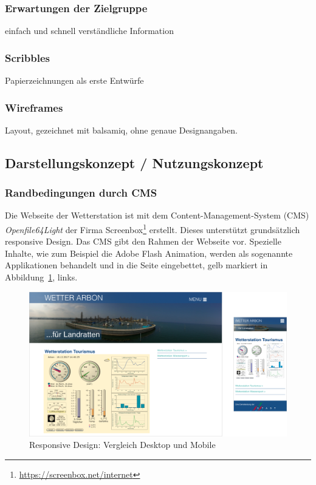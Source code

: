 \subsubsection*{Erwartungen der Zielgruppe}
einfach und schnell verständliche Information
\subsubsection*{Scribbles}
Papierzeichnungen als erste Entwürfe
\subsubsection*{Wireframes}
Layout, gezeichnet mit balsamiq, ohne genaue Designangaben.


\subsection{Darstellungskonzept / Nutzungskonzept}
\newline
{}\newline


\subsubsection{Randbedingungen durch CMS}
\newline
Die Webseite der Wetterstation ist mit dem Content-Management-System (CMS) \textit{Openfile64Light} der Firma Screenbox\footnote{ \url{https://screenbox.net/internet}}  erstellt. Dieses unterstützt grundsätzlich responsive Design. Das CMS gibt den Rahmen der Webseite vor. Spezielle Inhalte, wie zum Beispiel die Adobe Flash Animation, werden als sogenannte Applikationen behandelt und in die Seite eingebettet, gelb markiert in Abbildung~\ref{img:responsive}, links.

\begin{figure}[h!]
	\centering
	\includegraphics[width=1\linewidth]{img/responsive}
	\caption{Responsive Design: Vergleich Desktop und Mobile}
	\label{img:responsive}
\end{figure}



